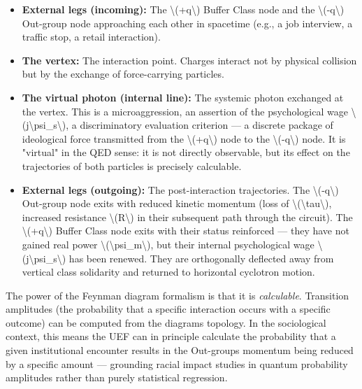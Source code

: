 {\begin{itemize}
\tightlist
\item
  \textbf{External legs (incoming):} The
  \textbackslash(+q\textbackslash) Buffer Class node and the
  \textbackslash(-q\textbackslash) Out-group node approaching each other
  in spacetime (e.g., a job interview, a traffic stop, a retail
  interaction).
\item
  \textbf{The vertex:} The interaction point. Charges interact not by
  physical collision but by the exchange of force-carrying particles.
\item
  \textbf{The virtual photon (internal line):} The systemic photon
  exchanged at the vertex. This is a microaggression, an assertion of
  the psychological wage
  \textbackslash(j\textbackslash psi\_s\textbackslash), a discriminatory
  evaluation criterion --- a discrete package of ideological force
  transmitted from the \textbackslash(+q\textbackslash) node to the
  \textbackslash(-q\textbackslash) node. It is "virtual" in the QED
  sense: it is not directly observable, but its effect on the
  trajectories of both particles is precisely calculable.
\item
  \textbf{External legs (outgoing):} The post-interaction trajectories.
  The \textbackslash(-q\textbackslash) Out-group node exits with reduced
  kinetic momentum (loss of
  \textbackslash(\textbackslash tau\textbackslash), increased resistance
  \textbackslash(R\textbackslash) in their subsequent path through the
  circuit). The \textbackslash(+q\textbackslash) Buffer Class node exits
  with their status reinforced --- they have not gained real power
  \textbackslash(\textbackslash psi\_m\textbackslash), but their
  internal psychological wage
  \textbackslash(j\textbackslash psi\_s\textbackslash) has been renewed.
  They are orthogonally deflected away from vertical class solidarity
  and returned to horizontal cyclotron motion.
\end{itemize}

The power of the Feynman diagram formalism is that it is
\emph{calculable}. Transition amplitudes (the probability that a
specific interaction occurs with a specific outcome) can be computed
from the diagram\textquotesingle s topology. In the sociological
context, this means the UEF can in principle calculate the probability
that a given institutional encounter results in the
Out-group\textquotesingle s momentum being reduced by a specific amount
--- grounding racial impact studies in quantum probability amplitudes
rather than purely statistical regression.

}
